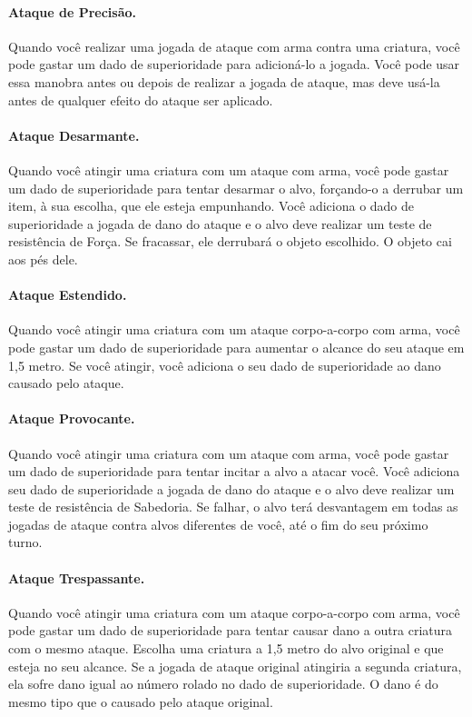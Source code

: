 \documentclass{RPG_Adventure}[2021/10/20]
\begin{document}
\paragraph{Ataque de Precisão.} Quando você realizar uma jogada de ataque com
arma contra uma criatura, você pode gastar um dado de superioridade para
adicioná-lo a jogada. Você pode usar essa manobra antes ou depois de realizar a
jogada de ataque, mas deve usá-la antes de qualquer efeito do ataque ser
aplicado.

\paragraph{Ataque Desarmante.} Quando você atingir uma criatura com um ataque
com arma, você pode gastar um dado de superioridade para tentar desarmar o alvo,
forçando-o a derrubar um item, à sua escolha, que ele esteja empunhando. Você
adiciona o dado de superioridade a jogada de dano do ataque e o alvo deve
realizar um teste de resistência de Força. Se fracassar, ele derrubará o objeto
escolhido. O objeto cai aos pés dele.

\paragraph{Ataque Estendido.} Quando você atingir uma criatura com um ataque
corpo-a-corpo com arma, você pode gastar um dado de superioridade para aumentar
o alcance do seu ataque em 1,5 metro. Se você atingir, você adiciona o seu dado
de superioridade ao dano causado pelo ataque.

\paragraph{Ataque Provocante.} Quando você atingir uma criatura com um ataque
com arma, você pode gastar um dado de superioridade para tentar incitar a alvo a
atacar você. Você adiciona seu dado de superioridade a jogada de dano do ataque
e o alvo deve realizar um teste de resistência de Sabedoria. Se falhar, o alvo
terá desvantagem em todas as jogadas de ataque contra alvos diferentes de você,
até o fim do seu próximo turno.

\paragraph{Ataque Trespassante.} Quando você atingir uma criatura com um ataque
corpo-a-corpo com arma, você pode gastar um dado de superioridade para tentar
causar dano a outra criatura com o mesmo ataque. Escolha uma criatura a 1,5
metro do alvo original e que esteja no seu alcance. Se a jogada de ataque
original atingiria a segunda criatura, ela sofre dano igual ao número rolado no
dado de superioridade. O dano é do mesmo tipo que o causado pelo ataque
original.
\end{document}
